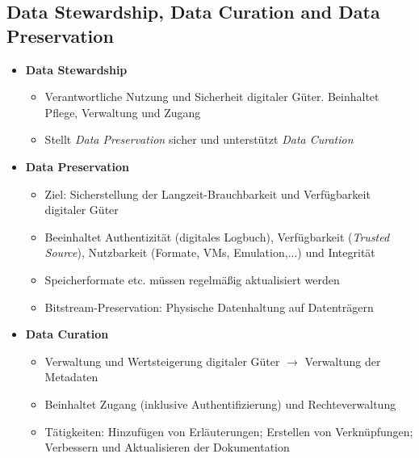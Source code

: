 \subsection{Data Stewardship, Data Curation and Data Preservation}
\begin{itemize}
	\item \textbf{Data Stewardship}
	\begin{itemize}
		\item Verantwortliche Nutzung und Sicherheit digitaler Güter. Beinhaltet Pflege, Verwaltung und Zugang
		\item Stellt \textit{Data Preservation} sicher und unterstützt \textit{Data Curation}
	\end{itemize}
	\item \textbf{Data Preservation}
	\begin{itemize}
		\item Ziel: Sicherstellung der Langzeit-Brauchbarkeit und Verfügbarkeit digitaler Güter
		\item Beeinhaltet Authentizität (digitales Logbuch), Verfügbarkeit (\textit{Trusted Source}), Nutzbarkeit (Formate, VMs, Emulation,...) und Integrität
		\item Speicherformate etc. müssen regelmäßig aktualisiert werden
		\item Bitstream-Preservation: Physische Datenhaltung auf Datenträgern
	\end{itemize}
	\item \textbf{Data Curation}
	\begin{itemize}
		\item Verwaltung und Wertsteigerung digitaler Güter \(\rightarrow\) Verwaltung der Metadaten
		\item Beinhaltet Zugang (inklusive Authentifizierung) und Rechteverwaltung
		\item Tätigkeiten: Hinzufügen von Erläuterungen; Erstellen von Verknüpfungen; Verbessern und Aktualisieren der Dokumentation
	\end{itemize}
\end{itemize}


